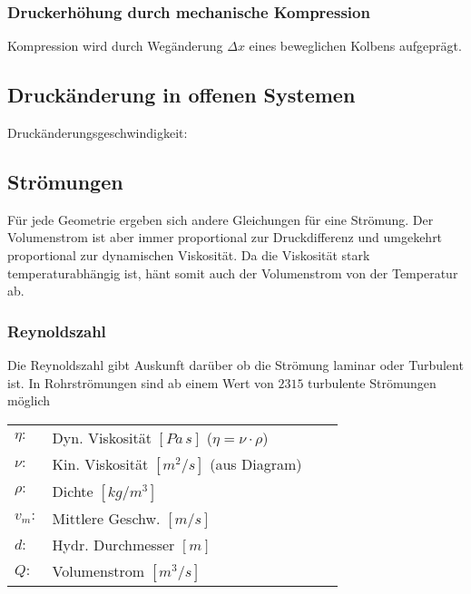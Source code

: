 \subsubsection{Druckerhöhung durch mechanische Kompression}
Kompression wird durch Wegänderung $\Delta x$ eines beweglichen Kolbens aufgeprägt.








\subsection{Druckänderung in offenen Systemen}
Druckänderungsgeschwindigkeit:



\vfill
\columnbreak
\subsection{Strömungen}
Für jede Geometrie ergeben sich andere Gleichungen für eine Strömung. Der Volumenstrom ist aber immer proportional zur Druckdifferenz und umgekehrt proportional zur dynamischen Viskosität. Da die Viskosität stark temperaturabhängig ist, hänt somit auch der Volumenstrom von der Temperatur ab.

\subsubsection{Reynoldszahl}
Die Reynoldszahl gibt Auskunft darüber ob die Strömung laminar oder Turbulent ist. In Rohrströmungen sind ab einem Wert von $2315$ turbulente Strömungen möglich
\begin{tabular}{llll}
$\eta:$ & Dyn. Viskosität $[Pa \, s]$ \qquad ($\eta = \nu \cdot \rho$)\\
$\nu:$ & Kin. Viskosität $[m^2/s]$ \qquad (aus Diagram) \\
$\rho:$ & Dichte $[kg/m^3]$  \\
$v_m:$ & Mittlere Geschw. $[m/s]$ \\
$d:$ & Hydr. Durchmesser $[m]$ \\
$Q:$ & Volumenstrom $[m^3/s]$
\end{tabular} \\


